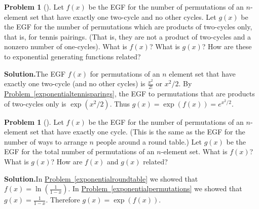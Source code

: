 \documentclass[10pt,]{book}
\theoremstyle{plain}
\theoremstyle{definition}
\newtheorem{activity}[project]{Problem}
\theoremstyle{definition}
\numberwithin{equation}{chapter}
\begin{document}
\begin{activity}[]\label{exp_two-cycle_}
Let \(f(x)\) be the EGF for the number of permutations of an \(n\)-element set that have exactly one two-cycle and no other cycles. Let \(g(x)\) be the EGF for the number of permutations which are products of two-cycles only, that is, for tennis pairings. (That is, they are not a product of two-cycles and a nonzero number of one-cycles). What is \(f(x)\)? What is \(g(x)\)? How are these to exponential generating functions related?%
\par\medskip\noindent%
\textbf{Solution.}\quad The EGF \(f(x)\) for permutations of an \(n\) element set that have exactly one two-cycle (and no other cycles) is \(\frac{x^2}{2!}\) or \(x^2/2\). By \hyperref[exponentialtennisparings]{Problem~\ref{exponentialtennisparings}}, the EGF to permutations that are products of two-cycles only is \(\exp(x^2/2)\). Thus \(g(x)=\exp(f(x))=e^{x^2/2}\).%
\end{activity}
\begin{activity}[]\label{exp_onecycle_}
Let \(f(x)\) be the EGF for the number of permutations of an \(n\)-element set that have exactly one cycle. (This is the same as the EGF for the number of ways to arrange \(n\) people around a round table.) Let \(g(x)\) be the EGF for the total number of permutations of an \(n\)-element set. What is \(f(x)\)? What is \(g(x)\)? How are \(f(x)\) and \(g(x)\) related?%
\par\medskip\noindent%
\textbf{Solution.}\quad In \hyperref[exponentialroundtable]{Problem~\ref{exponentialroundtable}} we showed that \(f(x) =
\ln\left(\frac{1}{1-x}\right)\). In \hyperref[exponentialpermutations]{Problem~\ref{exponentialpermutations}} we showed that \(g(x)=\frac{1}{1-x}\). Therefore \(g(x)= \exp(f(x))\).%
\end{activity}
\end{document}

